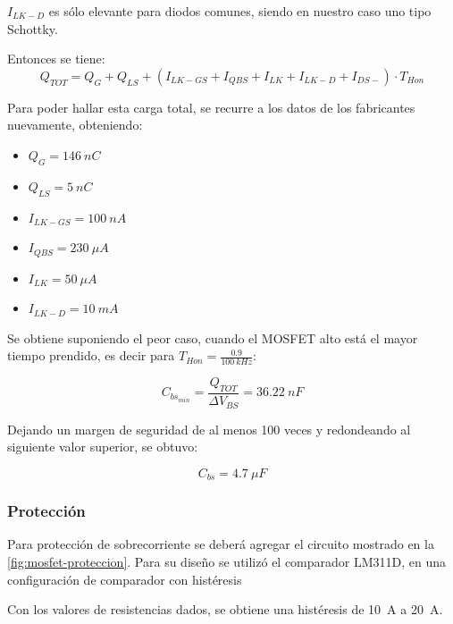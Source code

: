 \documentclass[../et.tex]{subfiles}
\begin{document}
  $I_{LK-D}$ es sólo elevante para diodos comunes, siendo en nuestro caso uno tipo Schottky.

  Entonces se tiene:
    \begin{equation}
      \label{eq:bootstrap-qtot}
      Q_{TOT} = Q_G + Q_{LS} + (I_{LK-GS} + I_{QBS} + I_{LK} + I_{LK-D} + I_{DS-}) \cdot T_{Hon}
    \end{equation}

  Para poder hallar esta carga total, se recurre a los datos de los fabricantes nuevamente, obteniendo:

    \begin{itemize}
      \item $Q_G = \SI{146}{nC}$
      \item $Q_{LS} = \SI{5}{nC}$
      \item $I_{LK-GS} = \SI{100}{nA}$
      \item $I_{QBS} = \SI{230}{\mu A}$
      \item $I_{LK} = \SI{50}{\mu A}$
      \item $I_{LK-D} = \SI{10}{mA}$
    \end{itemize}

  Se obtiene suponiendo el peor caso, cuando el MOSFET alto está el mayor tiempo prendido, es decir para $T_{Hon} = \frac{0.9}{\SI{100}{kHz}}$:

      \begin{equation}
          \label{eq:bootstrap-cmin}
          C_{bs_{min}} = \frac{Q_{TOT}}{\Delta V_{BS}} = \SI{36.22}{nF}
      \end{equation}

  Dejando un margen de seguridad de al menos 100 veces y redondeando al siguiente valor superior, se obtuvo:

    \[
      C_{bs} = \SI{4.7}{\mu F}
    \]

  \subsubsection{Protección}
  Para protección de sobrecorriente se deberá agregar el circuito mostrado en la \autoref{fig:mosfet-proteccion}. Para su diseño se utilizó el comparador LM311D, en una configuración de comparador con histéresis

  Con los valores de resistencias dados, se obtiene una histéresis de \SI{10}{A} a \SI{20}{A}.
\end{document}
